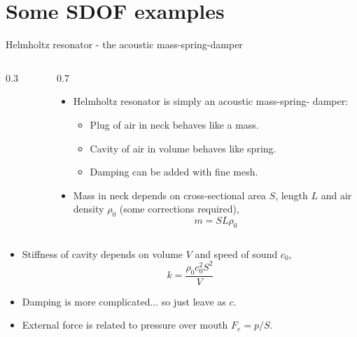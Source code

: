 \documentclass[11pt,aspectratio=169,handout]{beamer}
\begin{document}
\section{Some SDOF examples}
\begin{frame}[c]{Helmholtz resonator - the acoustic mass-spring-damper}
	\begin{columns}[T]
		\begin{column}{0.3\textwidth}
			\begin{figure}
				\vspace{-0.4cm}
				\centering
				
			\end{figure}
		\end{column}
		\begin{column}{0.7\textwidth}			
			\begin{itemize}
				\item<1-> Helmholtz resonator is simply an acoustic mass-spring- damper:
				\begin{itemize}
					\item[-] Plug of air in neck behaves like a mass.
					\item[-] Cavity of air in volume behaves like spring.
					\item[-] Damping can be added with fine mesh.
				\end{itemize}
			\item<2-> Mass in neck depends on cross-sectional area $S$, length $L$ and air density $\rho_0$ (some corrections required),
			\vspace{-0.3cm}
			\begin{equation}
				m = SL\rho_0
			\end{equation}
			\end{itemize}
		\end{column}
	\end{columns}
\vspace{-0.5cm}
\begin{itemize}
	\item<3-> Stiffness of cavity depends on volume $V$ and speed of sound $c_0$,
	\begin{equation}
		k = \frac{\rho_0c_0^2S^2}{V}
	\end{equation}
	\item<4-> Damping is more complicated... so just leave as $c$.
	\item<5-> External force is related to pressure over mouth $F_e = p/S$.
\end{itemize}
\end{frame}
\end{document}
